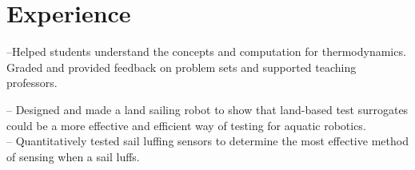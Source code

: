 \documentclass[]{deedy-resume-openfont}
\begin{document}
\begin{minipage}[t]{0.66\textwidth} 


\section{Experience}

--Helped students understand the concepts and computation for thermodynamics. Graded and provided feedback on problem sets and supported teaching professors.
\sectionsep

-- Designed and made a land sailing robot to show that land-based test surrogates could be a more effective and efficient way of testing for aquatic robotics. \\
-- Quantitatively tested sail luffing sensors to determine the most effective method of sensing when a sail luffs.
\sectionsep

\sectionsep



\end{minipage}
\end{document}
